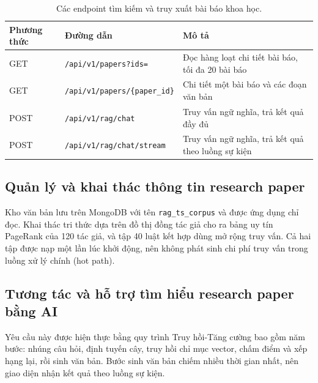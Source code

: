 \begin{table}[htbp]
    \centering
    \caption{Các endpoint tìm kiếm và truy xuất bài báo khoa học.}
    \label{tab:api-papers}
    \small
    \begin{tabularx}{\textwidth}{@{}l>{\raggedright\arraybackslash}p{6.8cm}>{\raggedright\arraybackslash}X@{}}
        \toprule
        \textbf{Phương thức} & \textbf{Đường dẫn} & \textbf{Mô tả} \\
        \midrule
        GET & \texttt{/api/v1/papers?ids=} & Đọc hàng loạt chi tiết bài báo, tối đa 20 bài báo \\
        GET & \texttt{/api/v1/papers/\{paper\_id\}} & Chi tiết một bài báo và các đoạn văn bản \\
        POST & \texttt{/api/v1/rag/chat} & Truy vấn ngữ nghĩa, trả kết quả đầy đủ \\
        POST & \texttt{/api/v1/rag/chat/stream} & Truy vấn ngữ nghĩa, trả kết quả theo luồng sự kiện \\
        \bottomrule
    \end{tabularx}
\end{table}

\subsection{Quản lý và khai thác thông tin research paper}
\label{subsec:khai-thac-paper}

Kho văn bản lưu trên MongoDB với tên \texttt{rag\_ts\_corpus} và được ứng dụng chỉ đọc. Khai thác tri thức dựa trên đồ thị đồng tác giả cho ra bảng uy tín PageRank của 120 tác giả, và tập 40 luật kết hợp dùng mở rộng truy vấn. Cả hai tập được nạp một lần lúc khởi động, nên không phát sinh chi phí truy vấn trong luồng xử lý chính (hot path).

\subsection{Tương tác và hỗ trợ tìm hiểu research paper bằng AI}
\label{subsec:tuong-tac-ai}

Yêu cầu này được hiện thực bằng quy trình Truy hồi-Tăng cường bao gồm năm bước: nhúng câu hỏi, định tuyến cây, truy hồi chỉ mục vector, chấm điểm và xếp hạng lại, rồi sinh văn bản. Bước sinh văn bản chiếm nhiều thời gian nhất, nên giao diện nhận kết quả theo luồng sự kiện.


